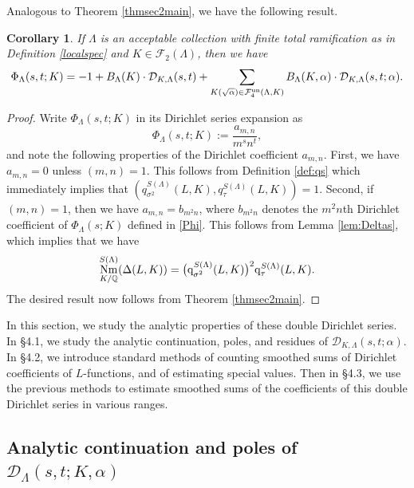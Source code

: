 \documentclass[10pt]{article}
\theoremstyle{plain}
\newtheorem{cor}[thm]{Corollary}
\theoremstyle{definition}
\theoremstyle{remark}
\DeclareMathOperator{\Norm}{Nm}
\def\un{{\rm un}}
\def\FF{{\mathcal F}}
\def\Q{{\mathbb Q}}
\def\Q{{\mathbb Q}}
\def\cD{{\mathcal D}}
\def\cF{{\mathcal F}}
\newcommand{\q}{{\rm q}}
\begin{document}
Analogous to Theorem \ref{thmsec2main}, we have the following result.
\begin{cor}\label{eqScounttrip}
If $\Lambda$ is an acceptable collection with finite total ramification as in Definition \ref{localspec} and $K \in \cF_2(\Lambda)$, then we have
\begin{equation}\label{eqcorparameq}
\Phi_{\Lambda}(s,t;K) = -1+
\displaystyle B_\Lambda(K)\cdot \cD_{K,\Lambda}(s,t) + 
\sum_{K(\sqrt{\alpha})\in\FF^\un_{4}(\Lambda,K)}B_\Lambda(K,\alpha)
\cdot\cD_{K,\Lambda}(s,t;\alpha).
\end{equation}
\end{cor}
\begin{proof}
Write $\Phi_\Lambda(s,t;K)$ in its Dirichlet series expansion as
\begin{equation*}
\Phi_\Lambda(s,t;K):= \frac{a_{m,n}}{m^sn^t},
\end{equation*}
and note the following properties of the Dirichlet coefficient $a_{m,n}$. First, we have $a_{m,n}=0$ unless $(m,n)=1$. This follows from Definition \ref{def:qs} which immediately implies that $(q_{\sigma^2}^{S(\Lambda)}(L,K),q_\tau^{S(\Lambda)}(L,K))=1$. Second, if $(m,n)=1$, then we have $a_{m,n} = b_{m^2n}$, where $b_{m^2n}$ denotes the $m^2n$th Dirichlet coefficient of $\Phi_\Lambda(s;K)$ defined in \eqref{Phi}. This follows from Lemma \ref{lem:Deltas}, which implies that we have 
\begin{equation*}
\Norm_{K/\Q}^{S(\Lambda)}(\Delta(L,K)) = \big(\q_{\sigma^2}^{S(\Lambda)}(L,K)\big)^2\q_\tau^{S(\Lambda)}(L,K).
\end{equation*}
The desired result now follows from Theorem \ref{thmsec2main}.
\end{proof}

In this section, we study the analytic properties of these double
Dirichlet series. In \S4.1, we study the analytic continuation, poles,
and residues of $\cD_{K,\Lambda}(s,t;\alpha)$. In \S4.2, we introduce
standard methods of counting smoothed sums of Dirichlet coefficients
of $L$-functions, and of estimating special values. Then in \S4.3, we
use the previous methods to estimate smoothed sums of the coefficients
of this double Dirichlet series in various ranges.



\subsection{Analytic continuation and poles of $\cD_\Lambda(s,t;K,\alpha)$}
\end{document}
